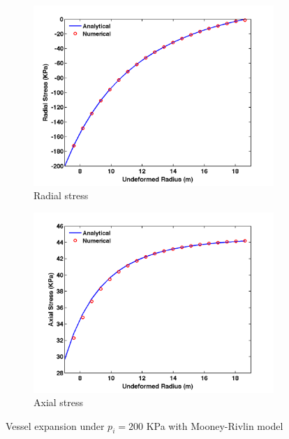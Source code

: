 \begin{figure}[H]
	\begin{subfigure}[b]{0.5\textwidth}
		\centering
		\includegraphics[width=\textwidth]{./figures/radial_stress_200.png}
		\caption{Radial stress}
		\label{radial_200}
	\end{subfigure}
	\begin{subfigure}[b]{0.5\textwidth}
		\centering
		\includegraphics[width=\textwidth]{./figures/axial_stress_200.png}
		\caption{Axial stress}
		\label{axial_200}
	\end{subfigure}
	\caption{Vessel expansion under $p_i = 200$ KPa with Mooney-Rivlin model}
	\label{fig:mooney-rivlin1}
\end{figure}

